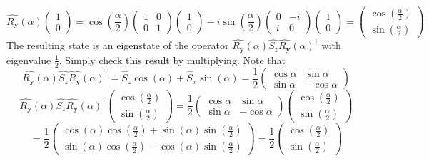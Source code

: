 \begin{sol}
\begin{enumerate}[label=\textbf{(\alph*)}]
$$\hat{R_\mathbf{y}}(\alpha)\begin{pmatrix}1\\0\end{pmatrix}=\cos(\frac{\alpha}{2})\begin{pmatrix}1&0\\0&1\end{pmatrix}\begin{pmatrix}1\\0\end{pmatrix}-i\sin(\frac{\alpha}{2})\begin{pmatrix}0&-i\\i&0\end{pmatrix}\begin{pmatrix}1\\0\end{pmatrix}=\begin{pmatrix}\cos(\frac{\alpha}{2})\\\sin(\frac{\alpha}{2})\end{pmatrix}$$ 
The resulting state is an eigenstate of the operator $\hat{R_\mathbf{y}}(\alpha)\hat{S_z}\hat{R_\mathbf{y}}(\alpha)^\dagger$ with eigenvalue $\frac{1}{2}$. Simply check this result by multiplying. Note that $$\hat{R_\mathbf{y}}(\alpha)\hat{S_z}\hat{R_\mathbf{y}}(\alpha)^\dagger=\hat S_z\cos(\alpha)+\hat S_x\sin(\alpha)=\frac{1}{2}\begin{pmatrix}\cos\alpha&\sin\alpha\\\sin\alpha&-\cos\alpha\end{pmatrix}$$
$$\hat{R_\mathbf{y}}(\alpha)\hat{S_z}\hat{R_\mathbf{y}}(\alpha)^\dagger\begin{pmatrix}\cos(\frac{\alpha}{2})\\\sin(\frac{\alpha}{2})\end{pmatrix}=\frac{1}{2}\begin{pmatrix}\cos\alpha&\sin\alpha\\\sin\alpha&-\cos\alpha\end{pmatrix}\begin{pmatrix}\cos(\frac{\alpha}{2})\\\sin(\frac{\alpha}{2})\end{pmatrix}$$
$$=\frac{1}{2}\begin{pmatrix}\cos(\alpha)\cos(\frac{\alpha}{2})+\sin(\alpha)\sin(\frac{\alpha}{2})\\\sin(\alpha)\cos(\frac{\alpha}{2})-\cos(\alpha)\sin(\frac{\alpha}{2})\end{pmatrix}=\frac{1}{2}\begin{pmatrix}\cos(\frac{\alpha}{2})\\\sin(\frac{\alpha}{2})\end{pmatrix}$$

\end{enumerate}
\end{sol}
